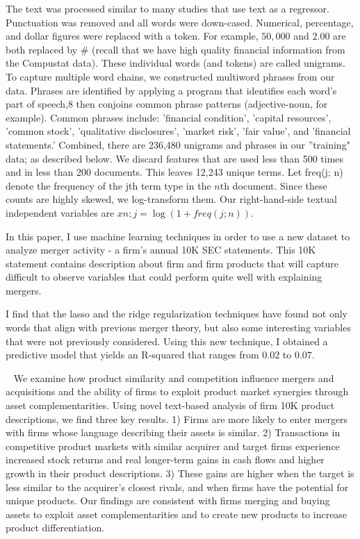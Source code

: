 \documentclass[11pt]{article}
\begin{document}
The text was processed similar to many studies that use text as a regressor. Punctuation
was removed and all words were down-cased. Numerical, percentage, and dollar figures were
replaced with a token. For example, $50,000$ and $2.00$ are both replaced by $\#$ (recall
that we have high quality financial information from the Compustat data). These individual
words (and tokens) are called unigrams. To capture multiple word chains, we constructed
multiword phrases from our data. Phrases are identified by applying a program that identifies each word's part of speech,8 then conjoins common phrase patterns (adjective-noun,
for example). Common phrases include: 'financial condition', 'capital resources', 'common
stock', 'qualitative disclosures', 'market risk', 'fair value', and 'financial statements.' Combined,
there are 236,480 unigrams and phrases in our ''training" data; as described below.
We discard features that are used less than 500 times and in less than 200 documents.
This leaves 12,243 unique terms. Let freq(j; n) denote the frequency
of the jth term type in the $n$th document. Since these counts are highly skewed, we log-transform them. Our
right-hand-side textual independent variables are $xn;j = \log (1 + freq(j; n))$.







In this paper, I use machine learning techniques in order to use a new dataset to analyze
merger activity - a firm’s annual 10K SEC statements. This 10K statement contains description
about firm and firm products that will capture difficult to observe
variables that could perform quite well with explaining mergers.

I find that the lasso and the ridge regularization techniques have found not only words that align with previous merger theory, but also some interesting
variables that were not previously considered. Using this new technique, I obtained a predictive
model that yields an R-squared that ranges from $0.02$ to $0.07$.

~\cite{hoberg2010}
We examine how product similarity and competition influence mergers and
acquisitions and the ability of firms to exploit product market synergies through
asset complementarities. Using novel text-based analysis of firm 10K product
descriptions, we find three key results. 1) Firms are more likely to enter
mergers with firms whose language describing their assets is similar. 2) Transactions in competitive product markets with similar acquirer and target firms
experience increased stock returns and real longer-term gains in cash flows and
higher growth in their product descriptions. 3) These gains are higher when
the target is less similar to the acquirer’s closest rivals, and when firms have the
potential for unique products. Our findings are consistent with firms merging
and buying assets to exploit asset complementarities and to create new
products to increase product differentiation.
\end{document}
